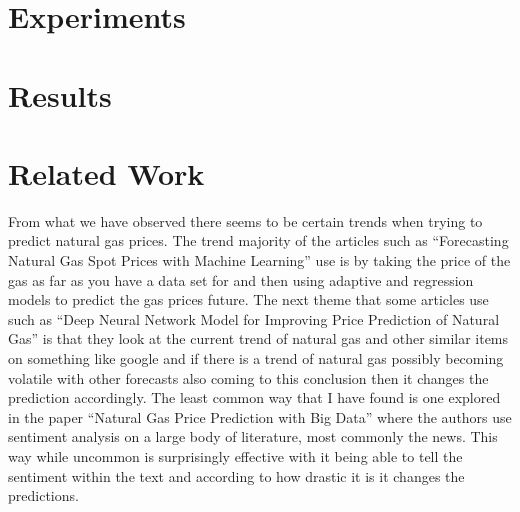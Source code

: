 \documentclass[final]{cvpr}
\begin{document}
\section{Experiments}

\section{Results}

\section{Related Work}

From what we have observed there seems to be certain trends when trying to
predict natural gas prices. The trend majority of the articles such as
“Forecasting Natural Gas Spot Prices with Machine Learning” use is by taking
the price of the gas as far as you have a data set for and then using
adaptive and regression models to predict the gas prices future. The next
theme that some articles use such as “Deep Neural Network Model for
Improving Price Prediction of Natural Gas” is that they look at the current
trend of natural gas and other similar items on something like google and if
there is a trend of natural gas possibly becoming volatile with other
forecasts also coming to this conclusion then it changes the prediction
accordingly. The least common way that I have found is one explored in the
paper “Natural Gas Price Prediction with Big Data” where the authors use
sentiment analysis on a large body of literature, most commonly the news.
This way while uncommon is surprisingly effective with it being able to tell
the sentiment within the text and according to how drastic it is it changes
the predictions.

\nocite{*}

{\small
    
    
}
\end{document}
